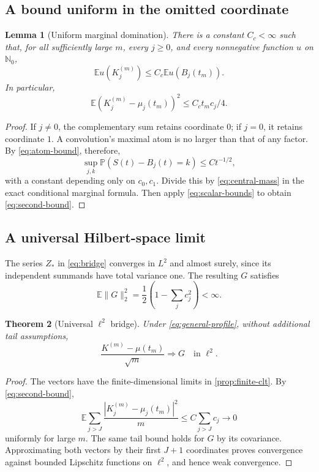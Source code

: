 \documentclass[11pt,a4paper]{article}
\numberwithin{equation}{section}
\newtheorem{theorem}{Theorem}[section]
\newtheorem{lemma}[theorem]{Lemma}
\theoremstyle{definition}
\theoremstyle{remark}
\newcommand{\E}{\mathbb E}
\newcommand{\PP}{\mathbb P}
\newcommand{\N}{\mathbb N}
\begin{document}
\subsection{A bound uniform in the omitted coordinate}
\begin{lemma}[Uniform marginal domination]
\label{lem:domination}
There is a constant $C_c<\infty$ such that, for all sufficiently large
$m$, every $j\ge0$, and every nonnegative function $u$ on $\N_0$,
\begin{equation}
\E u(K_j^{(m)})\le C_c\E u(B_j(t_m)).
\label{eq:domination}
\end{equation}
In particular,
\begin{equation}
\E(K_j^{(m)}-\mu_j(t_m))^2\le C_ct_mc_j/4.
\label{eq:second-bound}
\end{equation}
\end{lemma}
\begin{proof}
If $j\ne0$, the complementary sum retains coordinate $0$; if $j=0$,
it retains coordinate $1$. A convolution's maximal atom is no larger
than that of any factor. By \cref{eq:atom-bound}, therefore,
\[
\sup_{j,k}\PP(S(t)-B_j(t)=k)\le C t^{-1/2},
\]
with a constant depending only on $c_0,c_1$. Divide this by
\cref{eq:central-mass} in the exact conditional marginal formula.
Then apply \cref{eq:scalar-bounds} to obtain \cref{eq:second-bound}.
\end{proof}

\subsection{A universal Hilbert-space limit}
The series $Z_*$ in \cref{eq:bridge} converges in $L^2$ and almost surely,
since its independent summands have total variance one. The resulting
$G$ satisfies
\begin{equation}
\E\|G\|_2^2=\frac12\left(1-\sum_jc_j^2\right)<\infty.
\label{eq:bridge-l2}
\end{equation}

\begin{theorem}[Universal $\ell^2$ bridge]
\label{thm:universal-l2}
Under \cref{eq:general-profile}, without additional tail assumptions,
\begin{equation}
\frac{K^{(m)}-\mu(t_m)}{\sqrt m}\Rightarrow G
\quad\text{in }\ell^2.
\label{eq:l2-clt}
\end{equation}
\end{theorem}
\begin{proof}
The vectors have the finite-dimensional limits in
\cref{prop:finite-clt}. By \cref{eq:second-bound},
\[
\E\sum_{j>J}\frac{|K_j^{(m)}-\mu_j(t_m)|^2}{m}
\le C\sum_{j>J}c_j\longrightarrow0
\]
uniformly for large $m$. The same tail bound holds for $G$ by its
covariance. Approximating both vectors by their first $J+1$ coordinates
proves convergence against bounded Lipschitz functions on $\ell^2$,
and hence weak convergence.
\end{proof}
\end{document}
